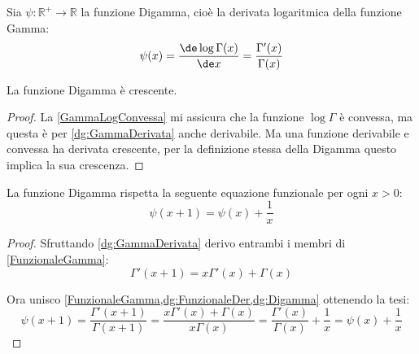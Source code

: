 \begin{definition}\label{dg:Digamma}
	Sia $\psi:\mathbb{R^+}\to\mathbb{R}$ la funzione Digamma, cioè la derivata logaritmica della funzione Gamma:
	\begin{equation*}
		\psi(x)=\frac{\de \log\Gamma(x)}{\de x}=\frac{\Gamma'(x)}{\Gamma(x)}
	\end{equation*}
\end{definition}

\begin{lemma}\label{dg:DigammaCresc}
	La funzione Digamma è crescente.
\end{lemma}
\begin{proof}
	La \cref{GammaLogConvessa} mi assicura che la funzione $\log\Gamma$ è convessa, ma questa è per \cref{dg:GammaDerivata}
	anche derivabile. Ma una funzione derivabile e convessa ha derivata crescente, per la definizione stessa della Digamma
	questo implica la sua crescenza.
\end{proof}

\begin{theorem}\label{dg:DigammaFunzionale}
	La funzione Digamma rispetta la seguente equazione funzionale per ogni $x>0$:
	\begin{equation*}
		\psi(x+1)=\psi(x)+\frac 1x
	\end{equation*}
\end{theorem}
\begin{proof}
	Sfruttando \cref{dg:GammaDerivata} derivo entrambi i membri di \cref{FunzionaleGamma}:
	\begin{equation}\label{dg:FunzionaleDer}
		\Gamma'(x+1)=x\Gamma'(x)+\Gamma(x)
	\end{equation}
	
	Ora unisco \cref{FunzionaleGamma,dg:FunzionaleDer,dg:Digamma} ottenendo la tesi:
	\begin{equation*}
		\psi(x+1)=\frac{\Gamma'(x+1)}{\Gamma(x+1)}=\frac{x\Gamma'(x)+\Gamma(x)}{x\Gamma(x)}=
		\frac{\Gamma'(x)}{\Gamma(x)}+\frac 1x=\psi(x)+\frac 1x
	\end{equation*}
\end{proof}

